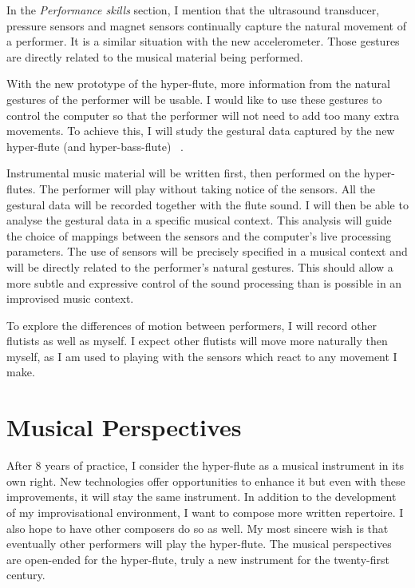 In the \emph{Performance skills} section, I mention that the ultrasound transducer, pressure sensors and magnet sensors continually capture the natural movement of a performer. It is a  similar situation with the new accelerometer.  Those gestures are directly related to the musical material being performed.

With the new prototype of the hyper-flute, more information from the natural gestures of the performer will be usable. I would like to use these gestures to control the computer so that the performer will not need to add too many extra movements. To achieve this, I will study the gestural data captured by the new hyper-flute (and hyper-bass-flute)~ \cite{Wanderley:2003}.

Instrumental music material will be written first, then performed on the hyper-flutes. The performer will play without taking notice of the sensors. All the gestural data will be recorded together with the flute sound. I will then be able to analyse the gestural data in a specific musical context. This analysis will guide the choice of mappings between the sensors and the computer's live processing parameters. The use of sensors will be precisely specified in a musical context and will be directly related to the performer's natural gestures. This should allow a more subtle and expressive control of the sound processing than is possible in an improvised music context.

To explore the differences of motion between performers, I will record other flutists as well as myself.   I expect other flutists will move more naturally then myself, as I am used to playing with the sensors which react to any movement I make. 



\section{Musical Perspectives}

After 8 years of practice, I consider the hyper-flute as a musical instrument in its own right. New technologies offer opportunities to enhance it but even with these improvements, it will stay the same instrument.  In addition to the development of my improvisational environment, I want to compose more written repertoire. I also hope to have other composers do so as well. My most sincere wish is that eventually other performers will play the hyper-flute. The musical perspectives are open-ended for the hyper-flute, truly a new instrument for the twenty-first century.


